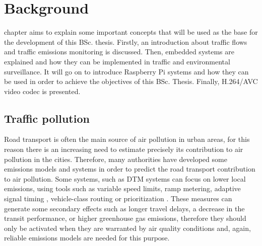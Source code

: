 
\chapter{Background}
\label{chap:background}

 chapter aims to explain some important concepts that will be used as the base for the development of this \ac{BSc.} thesis. Firstly, an introduction about traffic flows and traffic emissions monitoring is discussed. Then, embedded systems are explained and how they can be implemented in traffic and environmental surveillance. It will go on to introduce Raspberry Pi systems and how they can be used in order to achieve the objectives of this \ac{BSc.} Thesis. Finally, H.264/AVC video codec is presented.

\section{}





\section{Traffic pollution}

Road transport is often the main source of air pollution in urban areas, for this reason there is an increasing need to estimate precisely its contribution to air pollution in the cities. Therefore, many authorities have developed some emissions models and systems in order to predict the road transport contribution to air pollution. Some systems, such as \ac{DTM} systems can focus on lower local emissions, using tools such as variable speed limits, ramp metering, adaptive signal timing \cite{MK10}, vehicle-class routing or prioritization \cite{ZDHB09}. These measures can generate some secondary effects such as longer travel delays, a decrease in the transit performance, or higher greenhouse gas emissions, therefore they should only be activated when they are warranted by air quality conditions \cite{EMA09} and, again, reliable emissions models are needed for this purpose. 

